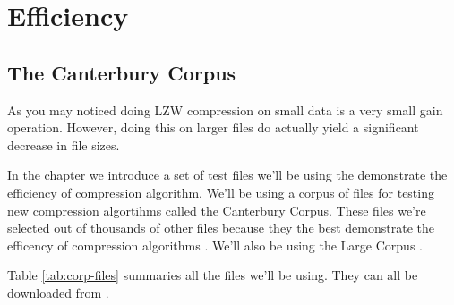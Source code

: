 \begin{refsection}
\begin{algorithm}[H]
\begin{algorithmic}[1]
       

      \State {}



    \EndWhile
  \end{algorithmic}
\end{algorithm}


\section{Efficiency}

\subsection{The Canterbury Corpus}

As you may noticed doing LZW compression on small data is a very small
gain operation. However, doing this on larger files do actually yield a
significant decrease in file sizes.

In the chapter we introduce a set of test files we'll be using the
demonstrate the efficiency of compression algorithm. We'll be using a
corpus of files for testing new compression algortihms called the
Canterbury Corpus. These files we're selected out of thousands of
other files because they the best demonstrate the efficency of
compression algorithms \cite{arnold:corpus}. We'll also be using the
Large Corpus \cite{powell:desc-corp}.

Table \ref{tab:corp-files} summaries all the files we'll be using. They can all be
downloaded from \cite{powell:desc-corp}.


\end{refsection}
